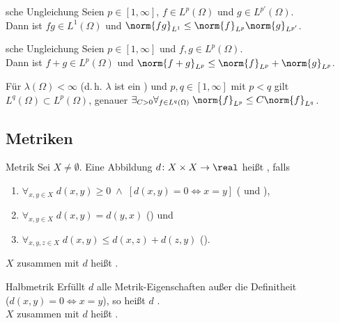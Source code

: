 \begin{Satz}{sche Ungleichung}
    Seien $p \in [1, \infty]$, $f \in L^p(\Omega)$ und $g \in L^{p'}(\Omega)$.\\
    Dann ist $fg \in L^1(\Omega)$ und $\norm{fg}_{L^1} \le \norm{f}_{L^p} \norm{g}_{L^{p'}}$.
\end{Satz}

\begin{Satz}{sche Ungleichung}
    Seien $p \in [1, \infty]$ und $f, g \in L^p(\Omega)$.\\
    Dann ist $f + g \in L^p(\Omega)$ und $\norm{f + g}_{L^p} \le \norm{f}_{L^p} + \norm{g}_{L^p}$.
\end{Satz}

\begin{Bem}
    Für $\lambda(\Omega) < \infty$ (d.\,h. $\lambda$ ist ein )
    und $p, q \in [1, \infty]$ mit $p < q$ gilt
    $L^q(\Omega) \subset L^p(\Omega)$, genauer
    $\exists_{C > 0} \forall_{f \in L^q(\Omega)}\; \norm{f}_{L^p} \le C \norm{f}_{L^q}$.
\end{Bem}

\subsection{%
    Metriken%
}

\begin{Def}{Metrik}
    Sei $X \not= \emptyset$.
    Eine Abbildung $d\colon X \times X \rightarrow \real$ heißt , falls
    \begin{enumerate}
        \item
        $\forall_{x, y \in X}\; d(x, y) \ge 0 \;\land\; [d(x, y) = 0 \iff x = y]$
        ( und ),
        
        \item
        $\forall_{x, y \in X}\; d(x, y) = d(y, x)$
        () und
        
        \item
        $\forall_{x, y, z \in X}\; d(x, y) \le d(x, z) + d(z, y)$
        ().
    \end{enumerate}
    $X$ zusammen mit $d$ heißt .
\end{Def}

\begin{Def}{Halbmetrik}
    Erfüllt $d$ alle Metrik-Eigenschaften außer die Definitheit\\
    ($d(x, y) = 0 \iff x = y$),
    so heißt $d$ .\\
    $X$ zusammen mit $d$ heißt .
\end{Def}

